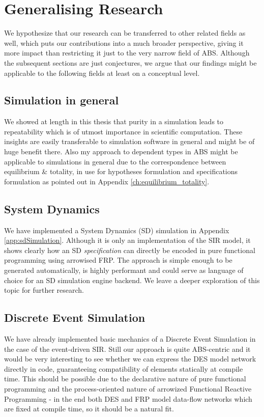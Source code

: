 \section{Generalising Research}
We hypothesize that our research can be transferred to other related fields as well, which puts our contributions into a much broader perspective, giving it more impact than restricting it just to the very narrow field of ABS. Although the subsequent sections are just conjectures, we argue that our findings might be applicable to the following fields at least on a conceptual level.

\subsection{Simulation in general}
We showed at length in this thesis that purity in a simulation leads to repeatability which is of utmost importance in scientific computation. These insights are easily transferable to simulation software in general and might be of huge benefit there. Also my approach to dependent types in ABS might be applicable to simulations in general due to the correspondence between equilibrium \& totality, in use for hypotheses formulation and specifications formulation as pointed out in Appendix \ref{ch:equilibrium_totality}. 

\subsection{System Dynamics}
We have implemented a System Dynamics (SD) simulation in Appendix \ref{app:sdSimulation}. Although it is only an implementation of the SIR model, it shows clearly how an SD \textit{specification} can directly be encoded in pure functional programming using arrowised FRP. The approach is simple enough to be generated automatically, is highly performant and could serve as language of choice for an SD simulation engine backend. We leave a deeper exploration of this topic for further research.

\subsection{Discrete Event Simulation}
We have already implemented basic mechanics of a Discrete Event Simulation in the case of the event-driven SIR. Still our approach is quite ABS-centric and it would be very interesting to see whether we can express the DES model network directly in code, guaranteeing compatibility of elements statically at compile time. This should be possible due to the declarative nature of pure functional programming and the process-oriented nature of arrowized Functional Reactive Programming - in the end both DES and FRP model data-flow networks which are fixed at compile time, so it should be a natural fit.

